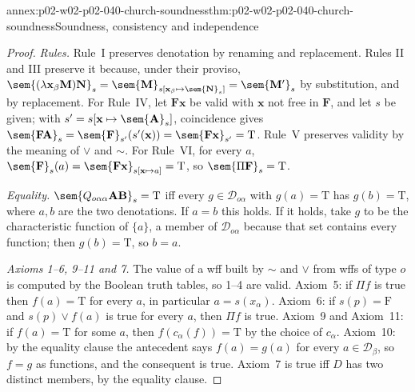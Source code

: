 \begin{annexitem}{annex:p02-w02-p02-040-church-soundness}{thm:p02-w02-p02-040-church-soundness}{Soundness, consistency and independence}
\begin{proof}
\emph{Rules.}  Rule~I preserves denotation by renaming and replacement.
Rules II and III preserve it because, under their proviso,
\(\sem{(\lambda\mathbf x_\beta\mathbf M)\mathbf N}_s=
\sem{\mathbf M}_{s[\mathbf x_\beta\mapsto\sem{\mathbf N}_s]}=\sem{\mathbf M'}_s\)
by substitution, and by replacement.  For Rule~IV, let
\(\mathbf F\mathbf x\) be valid with \(\mathbf x\) not free in \(\mathbf F\),
and let \(s\) be given; with \(s'=s[\mathbf x\mapsto\sem{\mathbf A}_s]\),
coincidence gives
\(\sem{\mathbf F\mathbf A}_s=\sem{\mathbf F}_{s'}(s'(\mathbf x))=\sem{\mathbf F\mathbf x}_{s'}=\mathrm T\).
Rule~V preserves validity by the meaning of \(\vee\) and \(\sim\).  For
Rule~VI, for every \(a\),
\(\sem{\mathbf F}_s(a)=\sem{\mathbf F\mathbf x}_{s[\mathbf x\mapsto a]}=\mathrm T\),
so \(\sem{\Pi\mathbf F}_s=\mathrm T\).

\emph{Equality.}  \(\sem{Q_{o\alpha\alpha}\mathbf A\mathbf B}_s=\mathrm T\) iff
every \(g\in\mathcal D_{o\alpha}\) with \(g(a)=\mathrm T\) has
\(g(b)=\mathrm T\), where \(a,b\) are the two denotations.  If \(a=b\) this
holds.  If it holds, take \(g\) to be the characteristic function of
\(\{a\}\), a member of \(\mathcal D_{o\alpha}\) because that set contains
every function; then \(g(b)=\mathrm T\), so \(b=a\).

\emph{Axioms 1--6, 9--11 and 7.}  The value of a wff built by \(\sim\) and
\(\vee\) from wffs of type \(o\) is computed by the Boolean truth tables, so
1--4 are valid.  Axiom~5: if \(\Pi f\) is true then \(f(a)=\mathrm T\) for
every \(a\), in particular \(a=s(x_\alpha)\).  Axiom~6: if
\(s(p)=\mathrm F\) and \(s(p)\vee f(a)\) is true for every \(a\), then
\(\Pi f\) is true.  Axiom~9 and Axiom~11: if \(f(a)=\mathrm T\) for some
\(a\), then \(f(c_\alpha(f))=\mathrm T\) by the choice of \(c_\alpha\).
Axiom~10: by the equality clause the antecedent says
\(f(a)=g(a)\) for every \(a\in\mathcal D_\beta\), so \(f=g\) as functions,
and the consequent is true.  Axiom~7 is true iff \(D\) has two distinct
members, by the equality clause.


\end{proof}
\end{annexitem}

